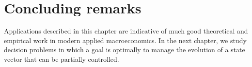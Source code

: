 %
%























\section{Concluding remarks}
Applications described  in this chapter are  indicative  of much  good theoretical and empirical work
in  modern applied macroeconomics. 
In the
next chapter, we study decision problems in which a goal is
optimally to manage the evolution of a state vector that can be
partially controlled.
%
%

\newpage



